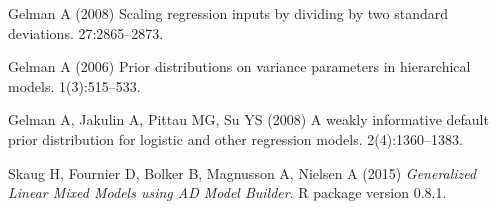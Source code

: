 \documentclass[9pt,twocolumn,twoside]{pnas-new}
\begin{document}
\begin{thebibliography}{10}
Gelman A (2008) Scaling regression inputs by dividing by two standard
  deviations.
 27:2865--2873.

Gelman A (2006) Prior distributions on variance parameters in hierarchical
  models.
 1(3):515--533.

Gelman A, Jakulin A, Pittau MG, Su YS (2008) A weakly informative default prior
  distribution for logistic and other regression models.
 2(4):1360--1383.

Skaug H, Fournier D, Bolker B, Magnusson A, Nielsen A (2015) {\em {Generalized
  Linear Mixed Models using AD Model Builder}}.
\newblock R package version 0.8.1.

\end{thebibliography}
\end{document}
